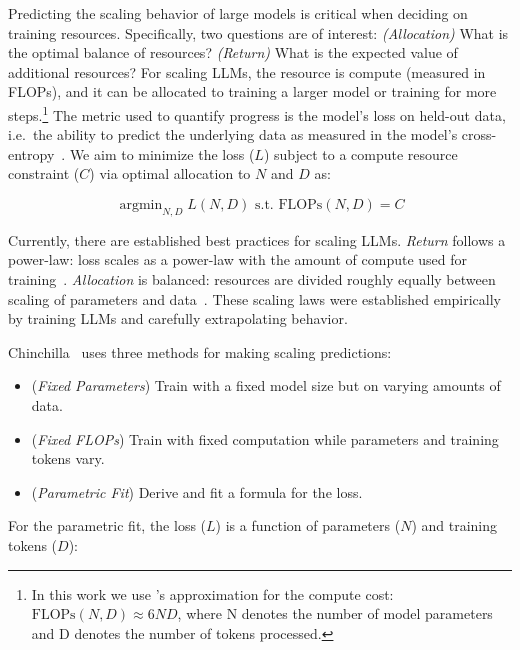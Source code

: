 \documentclass{article}
\DeclareMathOperator*{\argmin}{argmin}
\begin{document}
Predicting the scaling behavior of large models is critical when deciding on training resources. Specifically, two questions are of interest: \textit{(Allocation)} What is the optimal balance of resources? \textit{(Return)} What is the expected value of additional resources?  For scaling LLMs, the resource is compute (measured in FLOPs), and it can be allocated to training a larger model or training for more steps.\footnote{In this work we use  \cite{kaplan2020scaling}'s approximation for the compute cost: $\text{FLOPs}(N, D) \approx 6 N D$, where N denotes the number of model parameters and D denotes the number of tokens processed.}  The metric used to quantify progress is the model's loss on held-out data, i.e.\ the ability to predict the underlying data as measured in the model's cross-entropy~\cite{alabdulmohsin2022revisiting,hoffmann2022training}. We aim to minimize the loss ($L$) subject to a compute resource constraint ($C$) via optimal allocation to $N$ and $D$ as:

\begin{equation}\label{eq:model}
    \argmin_{N, D} L(N, D) \text{ s.t. } \text{FLOPs}(N, D) = C
\end{equation}

Currently, there are established best practices for scaling LLMs. \textit{Return} follows a power-law: loss scales as a power-law with the amount of compute used for training~\cite{henighan2020scaling,kaplan2020scaling,bahri2021explaining,ghorbani2021scaling,bansal2022data,hernandez2021scaling}. \textit{Allocation} is balanced: resources are divided roughly equally between scaling of parameters and data~\cite{hoffmann2022training}. These scaling laws were established empirically by training LLMs and carefully extrapolating behavior. 

Chinchilla~\cite{hoffmann2022training} uses three methods for making scaling predictions: 
\begin{itemize}
    \item 
(\textit{Fixed Parameters}) Train with a fixed model size but on varying amounts of data. 
\item (\textit{Fixed FLOPs}) Train with fixed computation while parameters and training tokens vary. 
\item (\textit{Parametric Fit}) Derive and fit a formula for the loss.
\end{itemize}

For the parametric fit, the loss ($L$) is a function of parameters ($N$) and training tokens ($D$):
\end{document}

